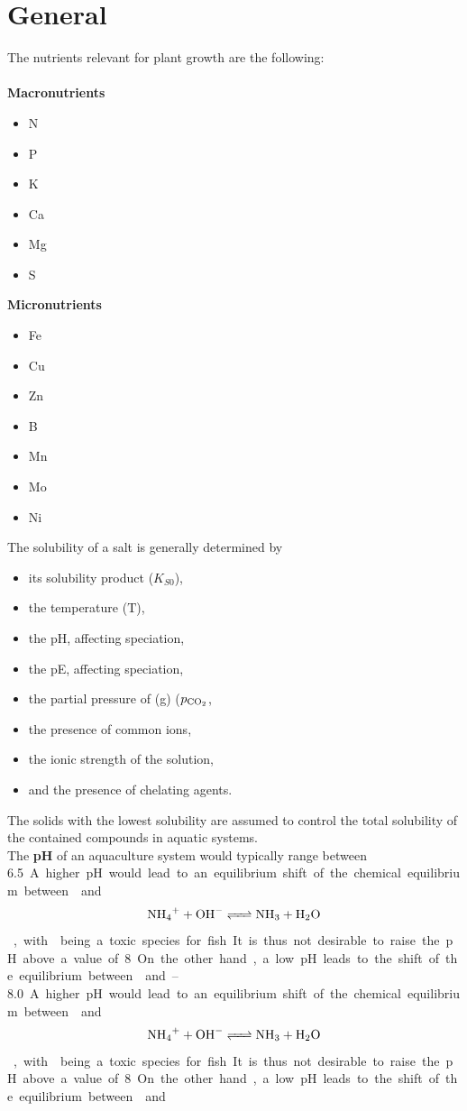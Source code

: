 \documentclass{scrartcl}
\begin{document}
\section{General}
The nutrients relevant for plant growth are the following:\\\\
\textbf{Macronutrients}
\begin{itemize}
	\item{N}
	\item{P}
	\item{K}
	\item{Ca}
	\item{Mg}
	\item{S}
\end{itemize}
\textbf{Micronutrients}
\begin{itemize}
	\item{Fe}
	\item{Cu}
	\item{Zn}
	\item{B}
	\item{Mn}
	\item{Mo}
	\item{Ni} 
\end{itemize}
The solubility of a salt is generally determined by 
\begin{itemize}
	\item{its solubility product ($K_{S0}$),}
	\item{the temperature ($\text{T}$),}
	\item{the pH, affecting speciation,}
	\item{the pE, affecting speciation,}
	\item{the partial pressure of (g) ($p_{\ce{CO2}}$,}
	\item{the presence of common ions,}
	\item{the ionic strength of the solution,}
	\item{and the presence of chelating agents.}
\end{itemize}
%
The solids with the lowest solubility are assumed to control the total solubility of the contained compounds in aquatic systems.\\
The \textbf{pH} of an aquaculture system would typically range between \SIrange{6.5}{8.0}. A higher pH would lead to an equilibrium shift of the chemical equilibrium between  and 
\begin{align}
	\ce{NH4+ + OH- <=> NH3 + H2O}	
\end{align}
, with  being a toxic species for fish. It is thus not desirable to raise the pH above a value of 8. On the other hand, a low pH leads to the shift of the equilibrium between  and 
\end{document}
